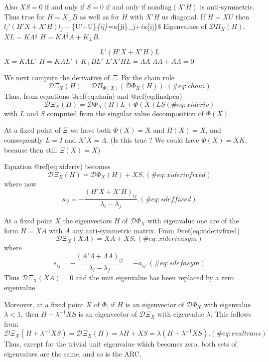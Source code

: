 \documentclass[
  12pt,
  letterpaper,
  DIV=11,
  numbers=noendperiod]{scrartcl}
\begin{document}
Also \(XS=0\) if and only if \(S=0\) if and only if
\(\text{nondiag}(X'H)\) is anti-symmetric. Thus true for \(H=X_\perp B\)
as well as for \(H\) with \(X'H\) us diagonal. If \(H=XU\) then
\(l_i'(H'X+X'H)l_j-\)\{U'\Lambda+\Lambda U\}\emph{\{ij\}=u}\{ji\}\lambda\_j+\lambda\emph{iu}\{ij\}\$
Eigenvalues of \(\mathcal{D}\Pi_X(H)\). \(XL=K\Lambda^\frac12\)
\(H=K\Lambda^\frac12 A+K_\perp B\).

\[
L'(H'X+X'H)L
\] \(X=K\Lambda L'\) \(H=KAL'+K_\perp BL'\) \(L'X'HL=\Lambda A\)
\(\Lambda A+A\Lambda=0\)

We next compute the derivative of \(\Xi\). By the chain rule
\begin{equation}
\mathcal{D}\Xi_X(H)=\mathcal{D}\Pi_{\Phi(X)}(\mathcal{D}\Phi_X(H)).
(\#eq:chain)
\end{equation} Thus, from equations @ref(eq:chain) and @ref(eq:finalpca)
\begin{equation}
\mathcal{D}\Xi_X(H)=\mathcal{D}\Phi_X(H)L+\Phi(X)LS
(\#eq:xideriv)
\end{equation} with \(L\) and \(S\) computed from the singular value
decomposition of \(\Phi(X)\).

At a fixed point of \(\Xi\) we have both \(\Phi(X)=X\) and \(\Pi(X)=X\),
and consequently \(L=I\) and \(X'X=\Lambda\). (Is this true ? We could
have \(\Phi(X)=XK\), because then still \(\Xi(X)=X\))

Equation @ref(eq:xideriv) becomes \begin{equation}
\mathcal{D}\Xi_X(H)=\mathcal{D}\Phi_X(H)+XS,
(\#eq:xiderivfixed)
\end{equation} where now \begin{equation}
s_{ij}=-\frac{(H'X+X'H)_{ij}}{\lambda_i-\lambda_j}.
(\#eq:sdeffixed)
\end{equation}

At a fixed point \(X\) the eigenvectors \(H\) of \(\mathcal{D}\Phi_X\)
with eigenvalue one are of the form \(H=XA\) with \(A\) any
anti-symmetric matrix. From @ref(eq:xiderivfixed) \begin{equation}
\mathcal{D}\Xi_X(XA)=XA+XS,
(\#eq:xiderivasym)
\end{equation} where \begin{equation}
s_{ij}=-\frac{(A'\Lambda+\Lambda A)_{ij}}{\lambda_i-\lambda_j}=-a_{ij}.
(\#eq:sdefasym)
\end{equation} Thus \(\mathcal{D}\Xi_X(XA)=0\) and the unit eigenvalue
has been replaced by a zero eigenvalue.

Moreover, at a fixed point \(X\) of \(\Phi\), if \(H\) is an eigenvector
of \(\mathcal{D}\Phi_X\) with eigenvalue \(\lambda<1\), then
\(H+\lambda^{-1}XS\) is an eigenvector of \(\mathcal{D}\Xi_X\) with
eigenvalue \(\lambda\). This follows from \begin{equation}
\mathcal{D}\Xi_X(H+\lambda^{-1}XS)=\mathcal{D}\Xi_X(H)=\lambda H+XS=\lambda(H+\lambda^{-1}XS).
(\#eq:evaltrans)
\end{equation} Thus, except for the trivial unit eigenvalue which
becomes zero, both sets of eigenvalues are the same, and so is the ARC.
\end{document}
